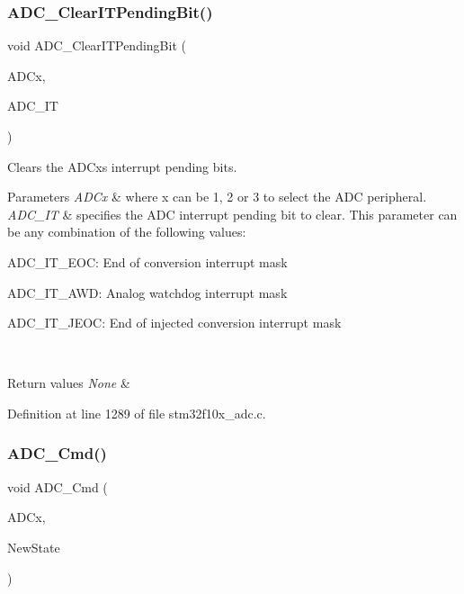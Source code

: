 \subsubsection{\texorpdfstring{A\+D\+C\+\_\+\+Clear\+I\+T\+Pending\+Bit()}{ADC\_ClearITPendingBit()}}
{\footnotesize\ttfamily void A\+D\+C\+\_\+\+Clear\+I\+T\+Pending\+Bit (\begin{DoxyParamCaption}\item[{\hyperlink{struct_a_d_c___type_def}{A\+D\+C\+\_\+\+Type\+Def} $\ast$}]{A\+D\+Cx,  }\item[{uint16\+\_\+t}]{A\+D\+C\+\_\+\+IT }\end{DoxyParamCaption})}



Clears the A\+D\+Cx\textquotesingle{}s interrupt pending bits. 


\begin{DoxyParams}{Parameters}
{\em A\+D\+Cx} & where x can be 1, 2 or 3 to select the A\+DC peripheral. \\
\hline
{\em A\+D\+C\+\_\+\+IT} & specifies the A\+DC interrupt pending bit to clear. This parameter can be any combination of the following values\+: \begin{DoxyItemize}
\item A\+D\+C\+\_\+\+I\+T\+\_\+\+E\+OC\+: End of conversion interrupt mask \item A\+D\+C\+\_\+\+I\+T\+\_\+\+A\+WD\+: Analog watchdog interrupt mask \item A\+D\+C\+\_\+\+I\+T\+\_\+\+J\+E\+OC\+: End of injected conversion interrupt mask \end{DoxyItemize}
\\
\hline
\end{DoxyParams}

\begin{DoxyRetVals}{Return values}
{\em None} & \\
\hline
\end{DoxyRetVals}


Definition at line 1289 of file stm32f10x\+\_\+adc.\+c.

\mbox{\label{group___a_d_c___private___functions_ga40882d399e3371755ed610c1134e634e}} 
\subsubsection{\texorpdfstring{A\+D\+C\+\_\+\+Cmd()}{ADC\_Cmd()}}
{\footnotesize\ttfamily void A\+D\+C\+\_\+\+Cmd (\begin{DoxyParamCaption}\item[{\hyperlink{struct_a_d_c___type_def}{A\+D\+C\+\_\+\+Type\+Def} $\ast$}]{A\+D\+Cx,  }\item[{\hyperlink{group___exported__types_gac9a7e9a35d2513ec15c3b537aaa4fba1}{Functional\+State}}]{New\+State }\end{DoxyParamCaption})}



